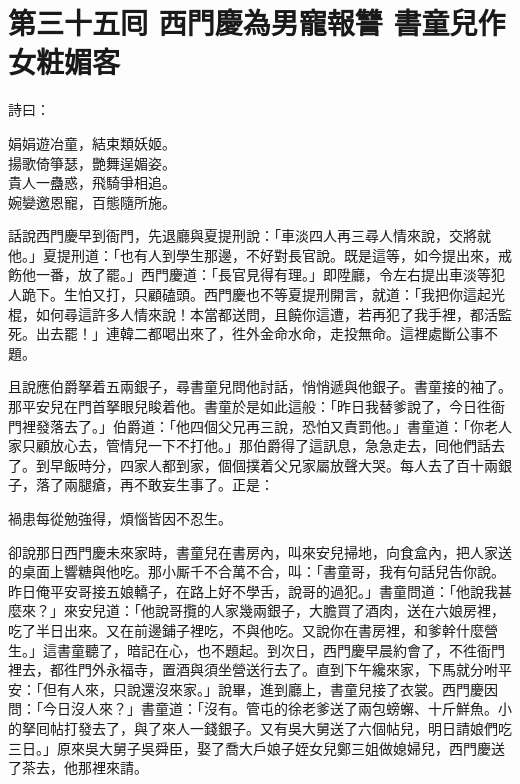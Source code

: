 
\chapter*{第三十五囘 西門慶為男寵報讐 書童兒作女粧媚客}


詩曰：

\begin{myquote} 
娟娟遊冶童，結束類妖姬。\\揚歌倚箏瑟，艷舞逞媚姿。\\貴人一蠱惑，飛騎爭相追。\\婉孌邀恩寵，百態隨所施。
\end{myquote} 

話說西門慶早到衙門，先退廳與夏提刑說：「車淡四人再三尋人情來說，交將就他。」夏提刑道：「也有人到學生那邊，不好對長官說。既是這等，如今提出來，戒飭他一番，放了罷。」西門慶道：「長官見得有理。」即陞廳，令左右提出車淡等犯人跪下。生怕又打，只顧磕頭。西門慶也不等夏提刑開言，就道：「我把你這起光棍，如何尋這許多人情來說！本當都送問，且饒你這遭，若再犯了我手裡，都活監死。出去罷！」連韓二都喝出來了，徃外金命水命，走投無命。這裡處斷公事不題。

且說應伯爵拏着五兩銀子，尋書童兒問他討話，悄悄遞與他銀子。書童接的袖了。那平安兒在門首拏眼兒睃着他。書童於是如此這般：「昨日我替爹說了，今日徃衙門裡發落去了。」伯爵道：「他四個父兄再三說，恐怕又責罰他。」書童道：「你老人家只顧放心去，管情兒一下不打他。」那伯爵得了這訊息，急急走去，囘他們話去了。到早飯時分，四家人都到家，個個撲着父兄家屬放聲大哭。每人去了百十兩銀子，落了兩腿瘡，再不敢妄生事了。{}正是：

\begin{myquote} 
禍患每從勉強得，煩惱皆因不忍生。
\end{myquote} 

卻說那日西門慶未來家時，書童兒在書房內，叫來安兒掃地，向食盒內，把人家送的桌面上響糖與他吃。{}那小厮千不合萬不合，叫：「書童哥，我有句話兒告你說。昨日俺平安哥接五娘轎子，在路上好不學舌，說哥的過犯。」書童問道：「他說我甚麼來？」來安兒道：「他說哥攬的人家幾兩銀子，大膽買了酒肉，送在六娘房裡，吃了半日出來。又在前邊鋪子裡吃，不與他吃。{}又說你在書房裡，和爹幹什麼營生。」這書童聽了，暗記在心，也不題起。到次日，西門慶早晨約會了，不徃衙門裡去，都徃門外永福寺，置酒與須坐營送行去了。直到下午纔來家，下馬就分咐平安：「但有人來，只說還沒來家。」說畢，進到廳上，書童兒接了衣裳。西門慶因問：「今日沒人來？」書童道：「沒有。管屯的徐老爹送了兩包螃蠏、十斤鮮魚。小的拏囘帖打發去了，與了來人一錢銀子。又有吳大舅送了六個帖兒，明日請娘們吃三日。」原來吳大舅子吳舜臣，娶了喬大戶娘子姪女兒鄭三姐做媳婦兒，西門慶送了茶去，他那裡來請。

